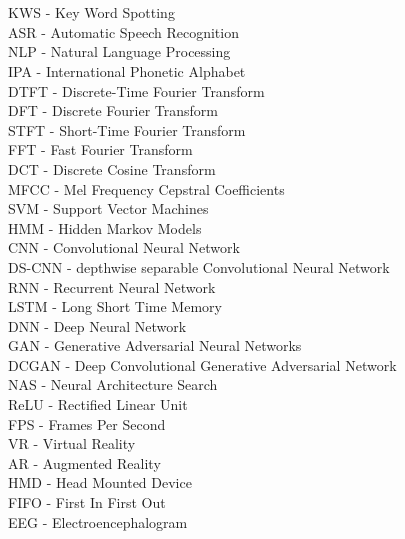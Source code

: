 
\chapter*{}
KWS - Key Word Spotting\\
ASR - Automatic Speech Recognition\\
NLP - Natural Language Processing\\
IPA - International Phonetic Alphabet\\
%
DTFT - Discrete-Time Fourier Transform\\
DFT - Discrete Fourier Transform\\
STFT - Short-Time Fourier Transform\\
FFT - Fast Fourier Transform\\
DCT - Discrete Cosine Transform\\
MFCC - Mel Frequency Cepstral Coefficients\\
%
SVM - Support Vector Machines\\
HMM - Hidden Markov Models\\
%
CNN - Convolutional Neural Network\\
DS-CNN - depthwise separable Convolutional Neural Network\\
RNN - Recurrent Neural Network\\
LSTM - Long Short Time Memory\\
DNN - Deep Neural Network\\
GAN - Generative Adversarial Neural Networks\\
DCGAN - Deep Convolutional Generative Adversarial Network\\
NAS - Neural Architecture Search\\
ReLU - Rectified Linear Unit\\
%
FPS - Frames Per Second\\
VR - Virtual Reality\\
AR - Augmented Reality\\
HMD - Head Mounted Device\\
%
FIFO - First In First Out\\
%
EEG - Electroencephalogram\\